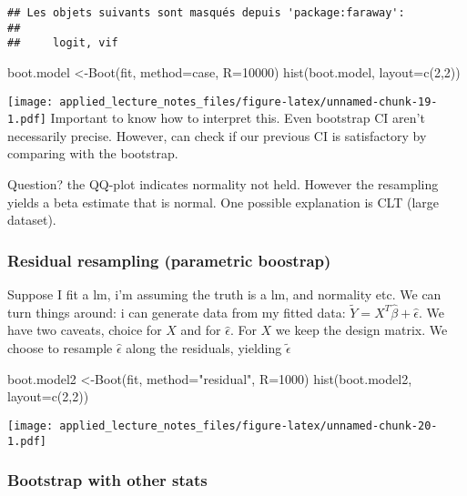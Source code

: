 \documentclass[
]{article}
\newenvironment{Shaded}{\begin{snugshade}}{\end{snugshade}}
\newcommand{\AttributeTok}[1]{\textcolor[rgb]{0.77,0.63,0.00}{#1}}
\newcommand{\DecValTok}[1]{\textcolor[rgb]{0.00,0.00,0.81}{#1}}
\newcommand{\FunctionTok}[1]{\textcolor[rgb]{0.00,0.00,0.00}{#1}}
\newcommand{\NormalTok}[1]{#1}
\newcommand{\OtherTok}[1]{\textcolor[rgb]{0.56,0.35,0.01}{#1}}
\newcommand{\StringTok}[1]{\textcolor[rgb]{0.31,0.60,0.02}{#1}}
\begin{document}
\begin{verbatim}
## Les objets suivants sont masqués depuis 'package:faraway':
## 
##     logit, vif
\end{verbatim}

\begin{Shaded}
\begin{Highlighting}[]
\NormalTok{boot.model }\OtherTok{\textless{}{-}}\FunctionTok{Boot}\NormalTok{(fit, }\AttributeTok{method=}\StringTok{\textquotesingle{}case\textquotesingle{}}\NormalTok{, }\AttributeTok{R=}\DecValTok{10000}\NormalTok{)}
\FunctionTok{hist}\NormalTok{(boot.model, }\AttributeTok{layout=}\FunctionTok{c}\NormalTok{(}\DecValTok{2}\NormalTok{,}\DecValTok{2}\NormalTok{))}
\end{Highlighting}
\end{Shaded}

\texttt{[image: applied\_lecture\_notes\_files/figure-latex/unnamed-chunk-19-1.pdf]}
Important to know how to interpret this. Even bootstrap CI aren't
necessarily precise. However, can check if our previous CI is
satisfactory by comparing with the bootstrap.

Question? the QQ-plot indicates normality not held. However the
resampling yields a beta estimate that is normal. One possible
explanation is CLT (large dataset).

\hypertarget{residual-resampling-parametric-boostrap}{%
\subsubsection{Residual resampling (parametric
boostrap)}\label{residual-resampling-parametric-boostrap}}

Suppose I fit a lm, i'm assuming the truth is a lm, and normality etc.
We can turn things around: i can generate data from my fitted data:
\(\tilde{Y}=X^T\hat{\beta}+\hat{\epsilon}\). We have two caveats, choice
for \(X\) and for \(\hat{\epsilon}\). For \(X\) we keep the design
matrix. We choose to resample \(\hat{\epsilon}\) along the residuals,
yielding \(\tilde{\epsilon}\)

\begin{Shaded}
\begin{Highlighting}[]
\NormalTok{boot.model2 }\OtherTok{\textless{}{-}}\FunctionTok{Boot}\NormalTok{(fit, }\AttributeTok{method=}\StringTok{"residual"}\NormalTok{, }\AttributeTok{R=}\DecValTok{1000}\NormalTok{)}
\FunctionTok{hist}\NormalTok{(boot.model2, }\AttributeTok{layout=}\FunctionTok{c}\NormalTok{(}\DecValTok{2}\NormalTok{,}\DecValTok{2}\NormalTok{))}
\end{Highlighting}
\end{Shaded}

\texttt{[image: applied\_lecture\_notes\_files/figure-latex/unnamed-chunk-20-1.pdf]}

\hypertarget{bootstrap-with-other-stats}{%
\subsubsection{Bootstrap with other
stats}\label{bootstrap-with-other-stats}}
\end{document}
